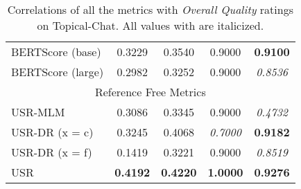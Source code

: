 \documentclass[11pt,a4paper]{article}
\begin{document}
\begin{table*}
\begin{tabular}{|l|c|c|c|c|}
BERTScore (base) & 0.3229 & 0.3540 & 0.9000 & \textbf{0.9100} \\
BERTScore (large) & 0.2982 & 0.3252 & 0.9000 & \textit{0.8536} \\ \hline
\multicolumn{5}{|c|}{Reference Free Metrics} \\ \hline
USR-MLM & 0.3086 & 0.3345 & 0.9000 & \textit{0.4732} \\
USR-DR (x = c) & 0.3245 & 0.4068 & \textit{0.7000} & \textbf{0.9182} \\
USR-DR (x = f) & 0.1419 & 0.3221 & 0.9000 & \textit{0.8519} \\
USR & \textbf{0.4192} & \textbf{0.4220} & \textbf{1.0000} & \textbf{0.9276} \\ \hline
    \end{tabular}
    \caption{Correlations of all the metrics with \textit{Overall Quality} ratings on Topical-Chat. All values with  are italicized.}
    
\end{table*}
\end{document}

